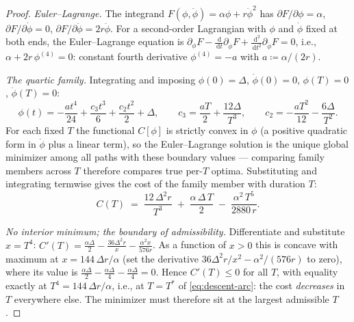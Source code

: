 \documentclass[11pt, a4paper]{article}
\theoremstyle{definition}
\theoremstyle{plain}
\theoremstyle{remark}
\newcommand{\dd}{\,\mathrm{d}}
\begin{document}
\begin{proof}
\emph{Euler--Lagrange.}  The integrand
$F(\phi, \ddot\phi) = \alpha\phi + r\ddot\phi^2$ has
$\partial F/\partial\phi = \alpha$,
$\partial F/\partial\dot\phi = 0$,
$\partial F/\partial\ddot\phi = 2r\ddot\phi$.  For a second-order
Lagrangian with $\phi$ and $\dot\phi$ fixed at both ends, the
Euler--Lagrange equation is
$\partial_\phi F - \tfrac{\dd}{\dd t}\partial_{\dot\phi}F
+ \tfrac{\dd^2}{\dd t^2}\partial_{\ddot\phi}F = 0$, i.e.,
$\alpha + 2r\,\phi^{(4)} = 0$: constant fourth derivative
$\phi^{(4)} = -a$ with $a \coloneqq \alpha/(2r)$.

\emph{The quartic family.}  Integrating and imposing
$\phi(0)=\Delta$, $\dot\phi(0)=0$, $\phi(T)=0$, $\dot\phi(T)=0$:
\[
  \phi(t) = -\frac{a t^4}{24} + \frac{c_3 t^3}{6}
    + \frac{c_2 t^2}{2} + \Delta,
  \qquad
  c_3 = \frac{aT}{2} + \frac{12\Delta}{T^3},
  \qquad
  c_2 = -\frac{aT^2}{12} - \frac{6\Delta}{T^2}.
\]
For each fixed $T$ the functional $C[\phi]$ is strictly convex in
$\phi$ (a positive quadratic form in $\ddot\phi$ plus a linear
term), so the Euler--Lagrange solution is the unique global minimizer
among all paths with these boundary values --- comparing family
members across $T$ therefore compares true per-$T$ optima.
Substituting and integrating termwise gives the cost of the family
member with duration $T$:
\begin{equation}\label{eq:descent-cost-T}
  C(T) \;=\; \frac{12\,\Delta^2 r}{T^3}
    \;+\; \frac{\alpha\,\Delta\,T}{2}
    \;-\; \frac{\alpha^2\,T^5}{2880\,r}.
\end{equation}

\emph{No interior minimum; the boundary of admissibility.}
Differentiate and substitute $x = T^4$:
$C'(T) = \tfrac{\alpha\Delta}{2} - \tfrac{36\Delta^2 r}{x}
- \tfrac{\alpha^2 x}{576 r}$.
As a function of $x > 0$ this is concave with maximum at
$x = 144\,\Delta r/\alpha$ (set the derivative
$36\Delta^2 r/x^2 - \alpha^2/(576r)$ to zero), where its value is
$\tfrac{\alpha\Delta}{2} - \tfrac{\alpha\Delta}{4}
- \tfrac{\alpha\Delta}{4} = 0$.  Hence $C'(T) \le 0$ for all $T$,
with equality exactly at $T^4 = 144\,\Delta r/\alpha$, i.e., at
$T = T^*$ of \cref{eq:descent-arc}: the cost \emph{decreases} in $T$
everywhere else.  The minimizer must therefore sit at the largest
admissible $T$.


\end{proof}
\end{document}
